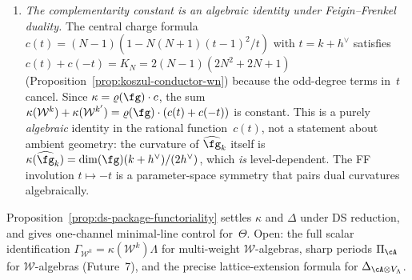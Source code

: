 \begin{remark}
\begin{enumerate}[label=\textup{(\roman*)}]
  $\operatorname{Sym}_\partial(\fg)$ to
  $\operatorname{Sym}_\partial(\fg^e)$ by Kostant's theorem:
  the generators change ($\fg \to \fg^e$), but the OPE pole
  orders and multiplicities are determined by the exponents
  of~$\fg$, invariant data that persist through the reduction.
  The discriminant polynomial $f(x,y)$ of the bar generating
  function is therefore the same for $\widehat{\fg}_k$ and
  $\mathcal{W}^k$, giving DS-invariance of~$\Delta$.
  Note that the Poisson brackets on $J_\infty(\fg^*)$ and
  $J_\infty(S_f)$ are \emph{different}; the DS-invariance
  of~$\Delta$ is not a statement about ``same Poisson structure''
  but about invariance of the leading pole data under the
  spectral sequence.
  More precisely, $\Delta$ is DS-invariant at the level of the
  Kazhdan-graded approximation; the exact quantum DS-invariance
  requires the PBW--Slodowy identification
  (Theorem~\ref{thm:w-pbw-slodowy-collapse}).
\item \emph{The complementarity constant is an algebraic identity
  under Feigin--Frenkel duality.}
  The central charge formula
  $c(t) = (N{-}1)(1 - N(N{+}1)(t{-}1)^2/t)$ with $t = k + h^\vee$
  satisfies $c(t) + c(-t) = K_N = 2(N{-}1)(2N^2{+}2N{+}1)$
  \textup{(}Proposition~\textup{\ref{prop:koszul-conductor-wn})}
  because the odd-degree terms in~$t$ cancel.  Since
  $\kappa = \varrho(\fg) \cdot c$, the sum
  $\kappa(\mathcal{W}^k) + \kappa(\mathcal{W}^{k'})
  = \varrho(\fg) \cdot (c(t) + c(-t))$ is constant.
  This is a purely \emph{algebraic} identity in the rational
  function~$c(t)$, not a statement about ambient geometry:
  the curvature of $\widehat{\fg}_k$ itself is
  $\kappa(\widehat{\fg}_k) = \dim(\fg)(k+h^\vee)/(2h^\vee)$,
  which \emph{is} level-dependent.  The FF involution
  $t \mapsto -t$ is a parameter-space symmetry that pairs
  dual curvatures algebraically.
\end{enumerate}
\end{remark}

\begin{remark}
\label{rem:ds-functoriality-open}
Proposition~\ref{prop:ds-package-functoriality} settles $\kappa$
and $\Delta$ under DS reduction, and gives one-channel
minimal-line control for~$\Theta$.  Open: the full scalar
identification
$\Gamma_{\mathcal{W}^k}=\kappa(\mathcal{W}^k)\Lambda$
for multi-weight $\mathcal{W}$-algebras, sharp periods
$\Pi_{\cA}$ for $\mathcal{W}$-algebras (Future~7), and the
precise lattice-extension formula for
$\Delta_{\cA\otimes V_\Lambda}$.
\end{remark}

